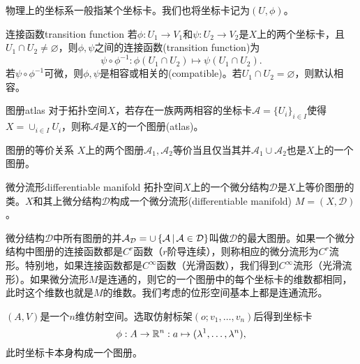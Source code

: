 物理上的坐标系一般指某个坐标卡。我们也将坐标卡记为$(U,\phi)$。
\begin{definition}{连接函数}{transition function}
    若$\phi:U_1\to V_1$和$\psi:U_2\to V_2$是$X$上的两个坐标卡，且$U_1\cap U_2\neq\varnothing$，则$\phi,\psi$之间的连接函数(transition function)为
    \begin{equation}
        \psi\circ\phi^{-1}:\phi(U_1\cap U_2)\mapsto\psi(U_1\cap U_2).
    \end{equation}
    若$\psi\circ\phi^{-1}$可微，则$\phi,\psi$是相容或相关的(compatible)。若$U_1\cap U_2=\varnothing$，则默认相容。
\end{definition}
\begin{definition}{图册}{atlas}
    对于拓扑空间$X$，若存在一族两两相容的坐标卡$\mathcal A=\{U_i\}_{i\in I}$使得$X=\cup_{i\in I}U_i$，则称$\mathcal A$是$X$的一个图册(atlas)。
\end{definition}
\begin{theorem}{图册的等价关系}{}
    $X$上的两个图册$\mathcal A_1,\mathcal A_2$等价当且仅当其并$\mathcal A_1\cup\mathcal A_2$也是$X$上的一个图册。
\end{theorem}
\begin{definition}{微分流形}{differentiable manifold}
    拓扑空间$X$上的一个微分结构$\mathcal D$是$X$上等价图册的类。$X$和其上微分结构$\mathcal D$构成一个微分流形(differentiable manifold) $M=(X,\mathcal D)$。
\end{definition}
微分结构$\mathcal D$中所有图册的并$\mathcal A_{\mathcal D}=\cup\left\{\mathcal A\,\middle\vert\,\mathcal A\in\mathcal D\right\}$叫做$\mathcal D$的最大图册。如果一个微分结构中图册的连接函数都是$C^r$函数（$r$阶导连续），则称相应的微分流形为$C^r$流形。特别地，如果连接函数都是$C^\infty$函数（光滑函数），我们得到$C^\infty$流形（光滑流形）。如果微分流形$M$是连通的，则它的一个图册中的每个坐标卡的维数都相同，此时这个维数也就是$M$的维数。我们考虑的位形空间基本上都是连通流形。
\begin{example}{}{}
    $(A,V)$是一个$n$维仿射空间。选取仿射标架$(o;v_1,\ldots,v_n)$后得到坐标卡
    \[
        \phi:A\to\mathbb R^n:a\mapsto(\lambda^1,\ldots,\lambda^n),
    \]
    此时坐标卡本身构成一个图册。
\end{example}
